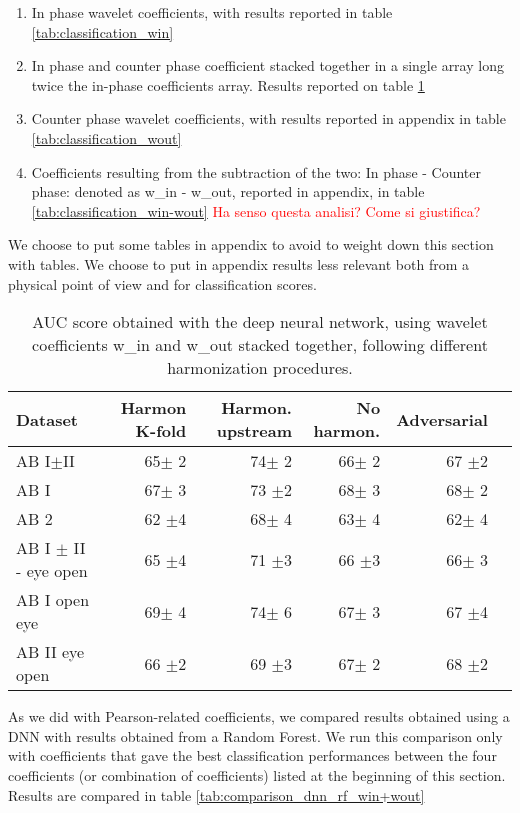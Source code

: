 \documentclass[11pt]{report}
\begin{document}
\begin{enumerate}
\item In phase wavelet coefficients, with results reported in table \ref{tab:classification_win}
\item In phase and counter phase coefficient stacked together in a single array long twice the in-phase coefficients array. Results reported on table \ref{tab:classification_win+wout}
\item Counter phase wavelet coefficients, with results reported in appendix in table \ref{tab:classification_wout}
\item Coefficients resulting from the subtraction of the two: In phase - Counter phase: denoted as w\_in - w\_out, reported in appendix, in table \ref{tab:classification_win-wout} \textcolor{red}{Ha senso questa analisi? Come si giustifica?}
\end{enumerate}

We choose to put some tables in appendix to avoid to weight down this section with tables. We choose to put in appendix results less relevant both from a physical point of view and for classification scores.

\begin{table}[!htp]\centering
\scriptsize
\begin{tabular}{lrrrrr}\toprule
Dataset &Harmon K-fold &Harmon. upstream &No harmon. &Adversarial \\\midrule
AB I$\pm$II &65$\pm$ 2 &74$\pm$ 2 &66$\pm$ 2 &67 $\pm$2 \\
AB I &67$\pm$ 3 &73 $\pm$2 &68$\pm$ 3 &68$\pm$ 2 \\
AB 2 &62 $\pm$4 &68$\pm$ 4 &63$\pm$ 4 &62$\pm$ 4 \\
AB I $\pm$ II - eye open &65 $\pm$4 &71 $\pm$3 &66 $\pm$3 &66$\pm$ 3 \\
AB I open eye &69$\pm$ 4 &74$\pm$ 6 &67$\pm$ 3 &67 $\pm$4 \\
AB II eye open &66 $\pm$2 &69 $\pm$3 &67$\pm$ 2 &68 $\pm$2 \\
\bottomrule
\end{tabular}
\caption{AUC score obtained with the deep neural network, using wavelet coefficients w\_in and w\_out stacked together, following different harmonization procedures.}\label{tab:classification_win+wout}
\end{table}

As we did with Pearson-related coefficients, we compared results obtained using a DNN with results obtained from a Random Forest. We run this comparison only with coefficients that gave the best classification performances between the four coefficients (or combination of coefficients) listed at the beginning of this section. Results are compared in table \ref{tab:comparison_dnn_rf_win+wout}
\end{document}
